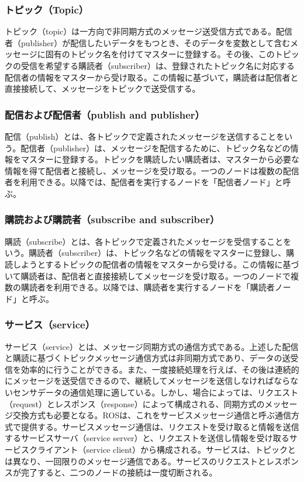 \subsubsection{トピック（Topic）}
トピック（topic）は一方向で非同期方式のメッセージ送受信方式である。配信者（publisher）が配信したいデータをもつとき、そのデータを変数として含むメッセージに固有のトピック名を付けてマスターに登録する。その後、このトピックの受信を希望する購読者（subscriber）は、登録されたトピック名に対応する配信者の情報をマスターから受け取る。この情報に基づいて，購読者は配信者と直接接続して、メッセージをトピックで送受信する。

\subsubsection{配信および配信者（publish and publisher）}
配信（publish）とは、各トピックで定義されたメッセージを送信することをいう。配信者（publisher）は、メッセージを配信するために、トピック名などの情報をマスターに登録する。トピックを購読したい購読者は、マスターから必要な情報を得て配信者と接続し、メッセージを受け取る。一つのノードは複数の配信者を利用できる。以降では、配信者を実行するノードを「配信者ノード」と呼ぶ。

\subsubsection{購読および購読者（subscribe and subscriber）}
購読（subscribe）とは、各トピックで定義されたメッセージを受信することをいう。購読者（subscriber）は、トピック名などの情報をマスターに登録し、購読しようとするトピックの配信者の情報をマスターから受ける。この情報に基づいて購読者は、配信者と直接接続してメッセージを受け取る。一つのノードで複数の購読者を利用できる。以降では、購読者を実行するノードを「購読者ノード」と呼ぶ。

\subsubsection{サービス（service）}
サービス（service）とは、メッセージ同期方式の通信方式である。上述した配信と購読に基づくトピックメッセージ通信方式は非同期方式であり、データの送受信を効率的に行うことができる。また、一度接続処理を行えば、その後は連続的にメッセージを送受信できるので、継続してメッセージを送信しなければならないセンサデータの通信処理に適している。しかし、場合によっては、リクエスト（request）とレスポンス（response）によって構成される、同期方式のメッセージ交換方式も必要となる。ROSは、これをサービスメッセージ通信と呼ぶ通信方式で提供する。サービスメッセージ通信は、リクエストを受け取ると情報を送信するサービスサーバ（service server）と、リクエストを送信し情報を受け取るサービスクライアント（service client）から構成される。サービスは、トピックとは異なり、一回限りのメッセージ通信である。サービスのリクエストとレスポンスが完了すると、二つのノードの接続は一度切断される。

